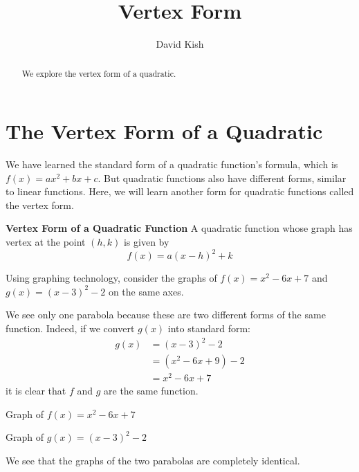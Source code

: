 \documentclass{ximera}
\author{David Kish}
\title{Vertex Form}
\begin{document}
\licenseY
\begin{abstract}
We explore the vertex form of a quadratic.
\end{abstract}
\maketitle


\section{The Vertex Form of a Quadratic}

      We have learned the standard form of a quadratic function's formula, which is $f(x)=ax^2+bx+c$.
      But quadratic functions also have different forms, similar to linear functions. Here, we will learn another form for quadratic functions called the vertex form.
\begin{callout} \textbf{\large{Vertex Form of a Quadratic Function}}
          A quadratic function whose graph has vertex at the point $(h,k)$ is given by
$$
f(x)=a(x-h)^2+k
$$
\end{callout}
    Using graphing technology, consider the graphs of $f(x)=x^2-6x+7$ and $g(x)=(x-3)^2-2$ on the same axes.

    We see only one parabola because these are two different forms of the same function.
    Indeed, if we convert $g(x)$ into standard form:
	\begin{align*}
		g(x)&=(x-3)^2-2\\
			&=(x^2-6x+9)-2\\
			&=x^2-6x+7
	\end{align*}
    it is clear that $f$ and $g$ are the same function.
 

    Graph of $f(x)=x^2-6x+7$ 
    \begin{image}
    \end{image}
    Graph of $g(x)=(x-3)^2-2$
    \begin{image}
    \end{image}
    We see that the graphs of the two parabolas are completely identical.
\end{document}
